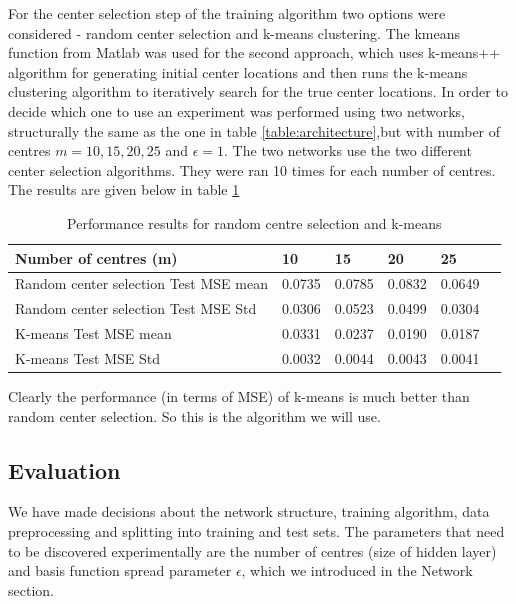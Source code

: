 \documentclass[a4paper, 11pt]{article}
\begin{document}
For the center selection step of the training algorithm two options were considered - random center selection and k-means clustering. The kmeans function from Matlab was used for the second approach, which uses k-means++ algorithm \cite{Arthur2007} for generating initial center locations and then runs the k-means clustering algorithm \cite{Lloyd82} to iteratively search for the true center locations. In order to decide which one to use an experiment was performed using two networks, structurally the same as the one in table \ref{table:architecture},but with number of centres $m = 10, 15, 20, 25$ and $\epsilon = 1$. The two networks use the two different center selection algorithms. They were ran 10 times for each number of centres. The results are given below in table \ref{table:centermse}

\begin{table}[h]
\centering
\begin{tabular}{| l | l | l | l | l | l |}
\hline
Number of centres (m) & 10 & 15 & 20 & 25 \\
\hline
Random center selection Test MSE mean & 0.0735 & 0.0785 & 0.0832 & 0.0649 \\
\hline
Random center selection Test MSE Std & 0.0306 & 0.0523 & 0.0499 & 0.0304 \\
\hline
K-means Test MSE mean & 0.0331 & 0.0237 & 0.0190 & 0.0187 \\
\hline
K-means Test MSE Std & 0.0032 & 0.0044 & 0.0043 & 0.0041 \\
\hline
\end{tabular}
\caption{Performance results for random centre selection and k-means}
\label{table:centermse}
\end{table}

Clearly the performance (in terms of MSE) of k-means is much better than random center selection. So this is the algorithm we will use.

\subsection*{Evaluation}
We have made decisions about the network structure, training algorithm, data preprocessing and splitting into training and test sets. The parameters that need to be discovered experimentally are the number of centres (size of hidden layer) and basis function spread parameter $\epsilon$, which we introduced in the Network section.
\end{document}
